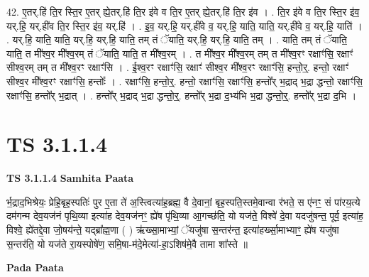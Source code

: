 \documentclass[17pt]{extarticle}
\begin{document}
42. ए॒तर्.हि॑ ति॒र स्ति॒र ए॒तर् ह्ये॒तर्.हि॑ ति॒र इ॑वे व ति॒र ए॒तर् ह्ये॒तर्.हि॑ ति॒र इ॑व । . ति॒र इ॑वे व ति॒र स्ति॒र इ॑व॒ यर्.हि॒ यर्.ही॑व ति॒र स्ति॒र इ॑व॒ यर्.हि॑ । . इ॒व॒ यर्.हि॒ यर्.ही॑वे व॒ यर्.हि॒ याति॒ याति॒ यर्.ही॑वे व॒ यर्.हि॒ याति॑ । . यर्.हि॒ याति॒ याति॒ यर्.हि॒ यर्.हि॒ याति॒ तम् तं ॅयाति॒ यर्.हि॒ यर्.हि॒ याति॒ तम् । . याति॒ तम् तं ॅयाति॒ याति॒ त मी᳚श्व॒र मी᳚श्व॒रम् तं ॅयाति॒ याति॒ त मी᳚श्व॒रम् । . त मी᳚श्व॒र मी᳚श्व॒रम् तम् त मी᳚श्व॒रꣳ रक्षाꣳ॑सि॒ रक्षाꣳ॑ सीश्व॒रम् तम् त मी᳚श्व॒रꣳ रक्षाꣳ॑सि । . ई॒श्व॒रꣳ रक्षाꣳ॑सि॒ रक्षाꣳ॑ सीश्व॒र मी᳚श्व॒रꣳ रक्षाꣳ॑सि॒ हन्तो॒र्॒. हन्तो॒ रक्षाꣳ॑ सीश्व॒र मी᳚श्व॒रꣳ रक्षाꣳ॑सि॒ हन्तोः᳚ । . रक्षाꣳ॑सि॒ हन्तो॒र्॒. हन्तो॒ रक्षाꣳ॑सि॒ रक्षाꣳ॑सि॒ हन्तो᳚र् भ॒द्राद् भ॒द्रा द्धन्तो॒ रक्षाꣳ॑सि॒ रक्षाꣳ॑सि॒ हन्तो᳚र् भ॒द्रात् । . हन्तो᳚र् भ॒द्राद् भ॒द्रा द्धन्तो॒र्॒. हन्तो᳚र् भ॒द्रा द॒भ्य॑भि भ॒द्रा द्धन्तो॒र्॒. हन्तो᳚र् भ॒द्रा द॒भि । \newline
\pagebreak
{}

\section{ TS 3.1.1.4 }

\textbf{TS 3.1.1.4 } \newline
\textbf{Samhita Paata} \newline

र्भ॒द्राद॒भिश्रेयः॒ प्रेहि॒बृह॒स्पतिः॑ पुर ए॒ता ते॑ अ॒स्त्वित्या॑ह॒ब्रह्म॒ वै दे॒वानां॒ बृह॒स्पति॒स्तमे॒वान्वा र॑भते॒ स ए॑नꣳ॒॒ सं पा॑रय॒त्ये दम॑गन्म देव॒यज॑नं पृथि॒व्या इत्या॑ह देव॒यज॑नꣳ॒॒ ह्ये॑ष पृ॑थि॒व्या आ॒गच्छ॑ति॒ यो यज॑ते॒ विश्वे॑ दे॒वा यदजु॑षन्त॒ पूर्व॒ इत्या॑ह॒ विश्वे॒ ह्ये॑तद्दे॒वा जो॒षय॑न्ते॒ यद्ब्रा᳚ह्म॒णा ( ) ऋ॑ख्सा॒माभ्यां॒ ॅयजु॑षा स॒न्तर॑न्त॒ इत्या॑हर्ख्सा॒माभ्याꣳ॒॒ ह्ये॑ष यजु॑षा स॒न्तर॑ति॒ यो यज॑ते रा॒यस्पोषे॑ण॒ समि॒षा-म॑दे॒मेत्या॑-हा॒ऽशिष॑मे॒वै तामा शा᳚स्ते ॥ \newline

\textbf{Pada Paata} \newline
\end{document}
